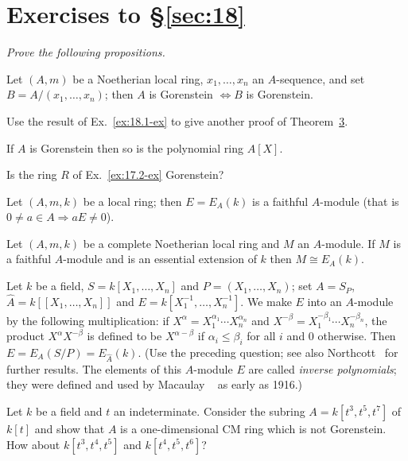 \section*{Exercises to \S\ref{sec:18}}
\emph{Prove the following propositions.}

\begin{exercise}\label{ex:18.1-ex}
Let $(A, m)$ be a Noetherian local ring, $x_1, \ldots, x_n$ an $A$-sequence, and set
$B = A/(x_1, \ldots, x_n)$; then $A$ is Gorenstein $\iff B$ is Gorenstein.
\end{exercise}

\begin{exercise}\label{ex:18.2-ex}
Use the result of Ex.~\ref{ex:18.1-ex} to give another proof of Theorem~\hyperref[thm:18.3]{3}.
\end{exercise}

\begin{exercise}\label{ex:18.3-ex}
If $A$ is Gorenstein then so is the polynomial ring $A[X]$.
\end{exercise}

\begin{exercise}\label{ex:18.4-ex}
Is the ring $R$ of Ex.~\ref{ex:17.2-ex} Gorenstein?
\end{exercise}

\begin{exercise}\label{ex:18.5-ex}
Let $(A, m, k)$ be a local ring; then $E = E_A(k)$ is a faithful $A$-module (that is
$0 \neq a \in A \Rightarrow aE \neq 0$).
\end{exercise}

\begin{exercise}\label{ex:18.6-ex}
Let $(A, m, k)$ be a complete Noetherian local ring and $M$ an $A$-module. If $M$
is a faithful $A$-module and is an essential extension of $k$ then $M \cong E_A(k)$.
\end{exercise}

\begin{exercise}\label{ex:18.7-ex}
Let $k$ be a field, $S = k[X_1, \ldots, X_n]$ and $P = (X_1, \ldots, X_n)$; set $A = S_P$,
$\hat{A} = k[[X_1, \ldots, X_n]]$ and $E = k[X_1^{-1}, \ldots, X_n^{-1}]$. We make $E$ into an
$A$-module by the following multiplication: if $X^\alpha = X_1^{\alpha_1} \cdots X_n^{\alpha_n}$ and $X^{-\beta}
= X_1^{-\beta_1} \cdots X_n^{-\beta_n}$, the product $X^\alpha X^{-\beta}$ is defined to be $X^{\alpha-\beta}$ if $\alpha_i \le \beta_i$ for all $i$
and $0$ otherwise. Then $E = E_A(S/P) = E_{\hat{A}}(k)$. (Use the preceding question;
see also Northcott~\cite{Nort8} for further results. The elements of this $A$-module
$E$ are called \emph{inverse polynomials}; they were defined and used by Macaulay
~\cite{Mac} as early as 1916.)
\end{exercise}

\begin{exercise}\label{ex:18.8-ex}
Let $k$ be a field and $t$ an indeterminate. Consider the subring $A =
k[t^3, t^5, t^7]$ of $k[t]$ and show that $A$ is a one-dimensional CM ring which
is not Gorenstein. How about $k[t^3, t^4, t^5]$ and $k[t^4, t^5, t^6]$?
\end{exercise}

